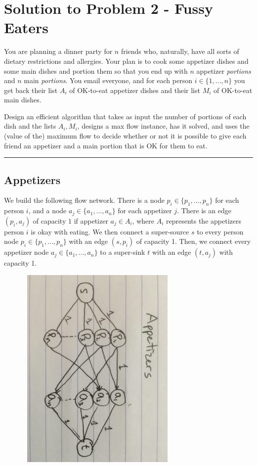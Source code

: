 \documentclass[11pt]{article}
\begin{document}
\section*{Solution to Problem 2 - Fussy Eaters}

You are planning a dinner party for $n$ friends who, naturally, have all sorts of dietary restrictions and allergies. Your plan is to cook some appetizer dishes and some main dishes and portion them so that you end up with $n$ appetizer \textit{portions} and $n$ main \textit{portions}. You email everyone, and for each person $i \in \{1, ... , n\}$ you get back their list $A_i$ of OK-to-eat appetizer dishes and their list $M_i$ of OK-to-eat main dishes.

Design an efficient algorithm that takes as input the number of portions of each dish and the lists $A_i, M_i$, designs a max flow instance, has it solved, and uses the (value of the) maximum flow to decide whether or not it is possible to give each friend an appetizer and a main portion that is OK for them to eat.

\noindent\rule{17cm}{0.4pt}
\subsection*{Appetizers}
We build the following flow network. There is a node $p_i \in \{p_1, ..., p_n\}$ for each person $i$, and a node $a_j \in \{a_1, ..., a_n\}$ for each appetizer $j$. There is an edge $(p_i, a_j)$ of capacity $1$ if appetizer $a_j \in A_i$, where $A_i$ represents the appetizers person $i$ is okay with eating. We then connect a super-source $s$ to every person node $p_i \in \{p_1, ..., p_n\}$ with an edge $(s, p_i)$ of capacity 1. Then, we connect every appetizer node $a_j \in \{a_1, ..., a_n\}$ to a super-sink $t$ with an edge $(t, a_j)$ with capacity 1.

\begin{center}
\includegraphics[width=10cm,height=10cm,keepaspectratio]{q2_appetizers}
\end{center}
\end{document}
